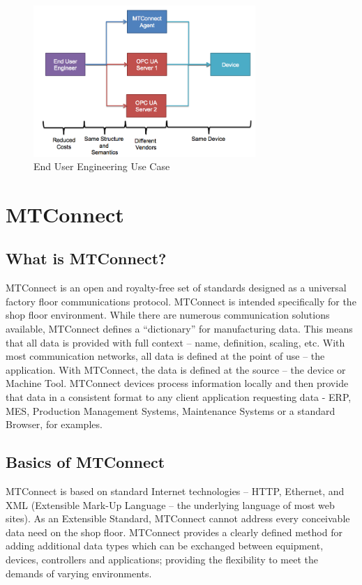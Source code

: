 \documentclass{mtconnect}	%
\begin{document}
\begin{figure}[h]
  \centering
  \includegraphics[width=0.75\textwidth]{diagrams/EndUserUseCase.png}
  \caption{End User Engineering Use Case}
  \label{fig:end_user_use_case}
\end{figure}

\section{MTConnect}

\subsection{What is MTConnect?}

MTConnect is an open and royalty-free set of standards designed as a universal factory floor communications protocol. MTConnect is intended specifically for the shop floor environment. While there are numerous communication solutions available, MTConnect defines a “dictionary” for manufacturing data. This means that all data is provided with full context – name, definition, scaling, etc. With most communication networks, all data is defined at the point of use – the application. With MTConnect, the data is defined at the source – the device or Machine Tool. MTConnect devices process information locally and then provide that data in a consistent format to any client application requesting data - ERP, MES, Production Management Systems, Maintenance Systems or a standard Browser, for examples.

\subsection{Basics of MTConnect}

MTConnect is based on standard Internet technologies – HTTP, Ethernet, and XML (Extensible Mark-Up Language – the underlying language of most web sites).
As an Extensible Standard, MTConnect cannot address every conceivable data need on the shop floor. MTConnect provides a clearly defined method for adding additional data types which can be exchanged between equipment, devices, controllers and applications; providing the flexibility to meet the demands of varying environments. 
\end{document}

